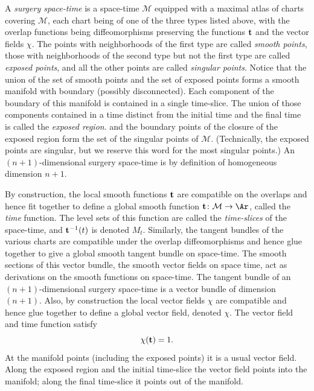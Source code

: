 \begin{definition}
\label{def:surgery-space-time}
\label{spacetime}
A {\em surgery space-time} is a
space-time  ${\mathcal M}$ equipped with a maximal atlas  of charts
covering ${\mathcal M}$, each chart being of one of the three types
listed above, with the overlap functions being diffeomorphisms
preserving the functions ${\bf t}$ and the vector fields $\chi$. The
points with neighborhoods of the first type are called {\em smooth
points}, those with neighborhoods of the second type but not the
first type are called {\em exposed points},
and all the other points are called {\em singular
points}. Notice that the union of
the set of smooth points and the set of exposed points forms a
smooth manifold with boundary (possibly disconnected). Each
component of the boundary of this manifold is contained in a single
time-slice. The union of those components contained in a time
distinct from the initial time and the final time is called the {\em
exposed region}. and the boundary points of
the closure of the exposed region form the set of the singular
points of ${\mathcal M}$. (Technically, the exposed points are
singular, but we reserve this word for the most singular points.) An
$(n+1)$-dimensional surgery space-time is by definition of
homogeneous dimension $n+1$.

By construction, the local smooth functions ${\bf t}$ are compatible
on the overlaps and hence fit together to define a global smooth
function ${\bf t}\colon {\mathcal M}\to \Ar$, called the {\em time}
function. The level sets of this function are called the {\em
time-slices} of the space-time, and ${\bf t}^{-1}(t)$ is denoted
$M_t$. Similarly, the tangent bundles of the various charts are
compatible under the overlap diffeomorphisms and hence glue together
to give a global smooth tangent bundle on space-time.  The smooth
sections of this vector bundle, the smooth vector fields on space
time, act as derivations on the smooth functions on space-time. The
tangent bundle of an $(n+1)$-dimensional surgery space-time is a
vector bundle of dimension $(n+1)$. Also, by construction the local
vector fields $\chi$ are compatible and hence glue together to
define a global vector field, denoted $\chi$. The vector field and
time function satisfy
$$\chi({\bf t})=1.$$
At the manifold points (including the exposed points) it is a usual
vector field. Along the exposed region and the initial time-slice
the vector field points into the manifold; along the final
time-slice it points out of the manifold.
\end{definition}




